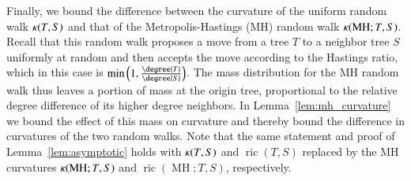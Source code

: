 \documentclass[]{elsarticle}
\newcommand{\MH}{\operatorname{MH}}
\newcommand{\curvature}[2][]{%
    \ifthenelse{\equal{#1}{}}%
		{\kappa(#2)}%
		{\kappa_{#1}(#2)}%
}
\newcommand{\ric}[1]{
	\operatorname{ric}(#1)%
}
\begin{document}
Finally, we bound the difference between the curvature of the uniform random walk $\curvature{T,S}$ and that of the Metropolis-Hastings (MH) random walk $\curvature{\MH; T,S}$.
Recall that this random walk proposes a move from a tree $T$ to a neighbor tree $S$ uniformly at random and then accepts the move according to the Hastings ratio, which in this case is $\min\left(1, \frac{\degree{T}}{\degree{S}}\right)$.
The mass distribution for the MH random walk thus leaves a portion of mass at the origin tree, proportional to the relative degree difference of its higher degree neighbors.
In Lemma~\ref{lem:mh_curvature} we bound the effect of this mass on curvature and thereby bound the difference in curvatures of the two random walks.
Note that the same statement and proof of Lemma~\ref{lem:asymptotic} holds with $\curvature{T,S}$ and $\ric{T,S}$ replaced by the MH curvatures $\curvature{\MH; T,S}$ and $\ric{\MH; T,S}$, respectively.
\end{document}
